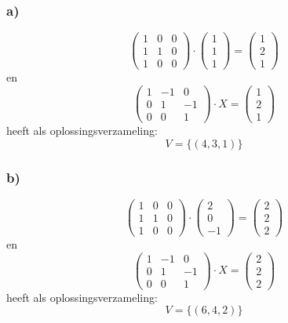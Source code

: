 \documentclass[lineaire_algebra_oplossingen.tex]{subfiles}
\begin{document}
\subsubsection*{a)}
\[
\begin{pmatrix}
1 & 0 & 0\\
1 & 1 & 0\\
1 & 0 & 0
\end{pmatrix}
\cdot
\begin{pmatrix}
1\\1\\1
\end{pmatrix}
=
\begin{pmatrix}
1\\2\\1
\end{pmatrix}
\]
en
\[
\begin{pmatrix}
1 & -1 & 0 \\
0 & 1 & -1 \\
0 & 0 & 1 
\end{pmatrix}
\cdot
X
=
\begin{pmatrix}
1\\2\\1
\end{pmatrix}
\]
heeft als oplossingsverzameling:
\[
V=\{(4,3,1)\}
\]
\subsubsection*{b)}
\[
\begin{pmatrix}
1 & 0 & 0\\
1 & 1 & 0\\
1 & 0 & 0
\end{pmatrix}
\cdot
\begin{pmatrix}
2\\0\\-1
\end{pmatrix}
=
\begin{pmatrix}
2\\2\\2
\end{pmatrix}
\]
en
\[
\begin{pmatrix}
1 & -1 & 0 \\
0 & 1 & -1 \\
0 & 0 & 1 
\end{pmatrix}
\cdot
X
=
\begin{pmatrix}
2\\2\\2
\end{pmatrix}
\]
heeft als oplossingsverzameling:
\[
V=\{(6,4,2)\}
\]
\end{document}
